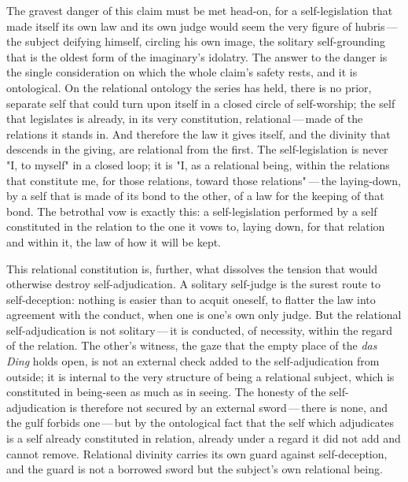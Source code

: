 The gravest danger of this claim must be met head-on, for a self-legislation that made itself its own law and its own judge would seem the very figure of hubris\,---\,the subject deifying himself, circling his own image, the solitary self-grounding that is the oldest form of the imaginary's idolatry. The answer to the danger is the single consideration on which the whole claim's safety rests, and it is ontological.  On the relational ontology the series has held, there is no prior, separate self that could turn upon itself in a closed circle of self-worship; the self that legislates is already, in its very constitution, relational\,---\,made of the relations it stands in. And therefore the law it gives itself, and the divinity that descends in the giving, are relational from the first. The self-legislation is never "I, to myself" in a closed loop; it is "I, as a relational being, within the relations that constitute me, for those relations, toward those relations"\,---\,the laying-down, by a self that is made of its bond to the other, of a law for the keeping of that bond. The betrothal vow is exactly this: a self-legislation performed by a self constituted in the relation to the one it vows to, laying down, for that relation and within it, the law of how it will be kept.

This relational constitution is, further, what dissolves the tension that would otherwise destroy self-adjudication. A solitary self-judge is the surest route to self-deception: nothing is easier than to acquit oneself, to flatter the law into agreement with the conduct, when one is one's own only judge. But the relational self-adjudication is not solitary\,---\,it is conducted, of necessity, within the regard of the relation. The other's witness, the gaze that the empty place of the \emph{das Ding} holds open, is not an external check added to the self-adjudication from outside; it is internal to the very structure of being a relational subject, which is constituted in being-seen as much as in seeing. The honesty of the self-adjudication is therefore not secured by an external sword\,---\,there is none, and the gulf forbids one\,---\,but by the ontological fact that the self which adjudicates is a self already constituted in relation, already under a regard it did not add and cannot remove. Relational divinity carries its own guard against self-deception, and the guard is not a borrowed sword but the subject's own relational being.

